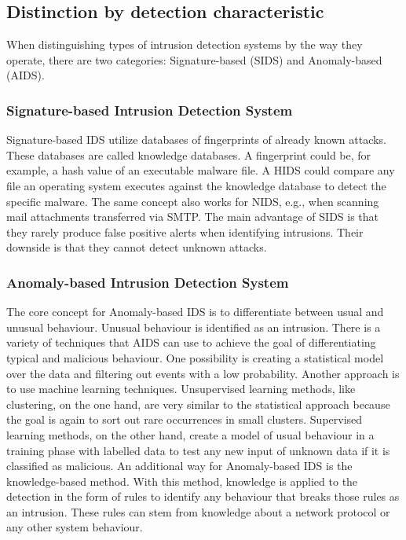\documentclass[
    fontsize=12pt,
    headings=small,
    parskip=half,           %
    bibliography=totoc,
    numbers=noenddot,       %
    open=any,               %
    ]{scrreprt}
\begin{document}
\subsection{Distinction by detection characteristic}
When distinguishing types of intrusion detection systems by the way they operate, there are two categories: Signature-based (SIDS) and Anomaly-based (AIDS).

\subsubsection{Signature-based Intrusion Detection System}
Signature-based IDS utilize databases of fingerprints of already known attacks. These databases are called knowledge databases. A fingerprint could be, for example, a hash value of an executable malware file. A HIDS could compare any file an operating system executes against the knowledge database to detect the specific malware. The same concept also works for NIDS, e.g., when scanning mail attachments transferred via SMTP. The main advantage of SIDS is that they rarely produce false positive alerts when identifying intrusions. Their downside is that they cannot detect unknown attacks.

\subsubsection{Anomaly-based Intrusion Detection System}
The core concept for Anomaly-based IDS is to differentiate between usual and unusual behaviour. Unusual behaviour is identified as an intrusion. There is a variety of techniques that AIDS can use to achieve the goal of differentiating typical and malicious behaviour. One possibility is creating a statistical model over the data and filtering out events with a low probability. 
Another approach is to use machine learning techniques. Unsupervised learning methods, like clustering, on the one hand, are very similar to the statistical approach because the goal is again to sort out rare occurrences in small clusters. Supervised learning methods, on the other hand, create a model of usual behaviour in a training phase with labelled data to test any new input of unknown data if it is classified as malicious. 
An additional way for Anomaly-based IDS is the knowledge-based method. With this method, knowledge is applied to the detection in the form of rules to identify any behaviour that breaks those rules as an intrusion. These rules can stem from knowledge about a network protocol or any other system behaviour.
\end{document}
